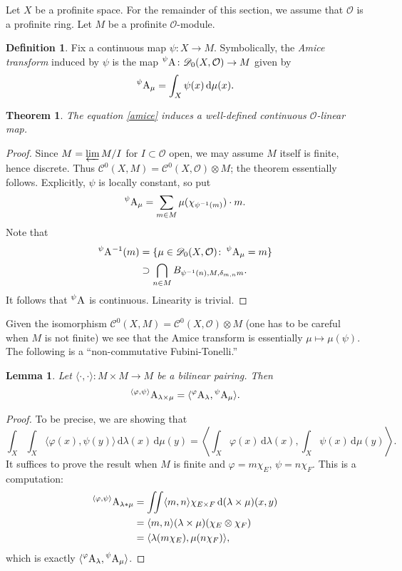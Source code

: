 \documentclass{article}
\newcommand{\cO}{\mathcal{O}}
\newcommand{\dd}{\mathrm{d}}
\newcommand{\sC}{\mathscr{C}}
\newcommand{\sD}{\mathscr{D}}
\newcommand{\amice}[2][]{\prescript{#1}{}{\mathrm{A}_{#2}}}
\newtheorem{lemma}[subsection]{Lemma}
\newtheorem{theorem}[subsection]{Theorem}
\theoremstyle{definition}
\newtheorem{definition}[subsection]{Definition}
\begin{document}
Let $X$ be a profinite space. For the remainder of this section, we assume that 
$\cO$ is a profinite ring. Let $M$ be a profinite $\cO$-module. 

\begin{definition}
Fix a continuous map $\psi\colon X\to M$. Symbolically, the \emph{Amice 
transform} induced by $\psi$ is the map 
$\amice[\psi]{}\colon \sD_0(X,\cO)\to M$ given by 
\begin{equation}\label{amice}
  \amice[\psi]{\mu} =  \int_X \psi(x)\, \dd \mu(x) .
\end{equation}
\end{definition}

\begin{theorem}
The equation \eqref{amice} induces a well-defined continuous $\cO$-linear map.
\end{theorem}
\begin{proof}
Since $M=\varprojlim M/I$ for $I\subset \cO$ open, we may assume $M$ itself is 
finite, hence discrete. Thus $\sC^0(X,M) = \sC^0(X,\cO)\otimes M$; the theorem 
essentially follows. Explicitly, $\psi$ is locally constant, so put
\[
  \amice[\psi]{\mu} = \sum_{m\in M} \mu(\chi_{\psi^{-1}(m)}) \cdot m.
\]
Note that 
\begin{align*}
  \amice[\psi]{}^{-1}(m) 
    &= \{\mu\in \sD_0(X,\cO)\colon \amice[\psi]{\mu} = m\} \\
    &\supset \bigcap_{n\in M} B_{\psi^{-1}(n),M,\delta_{m,n} m} .
\end{align*}
It follows that $\amice[\psi]{}$ is continuous. Linearity is trivial. 
\end{proof}

Given the isomorphism $\sC^0(X,M) = \sC^0(X,\cO)\otimes M$ (one has to be 
careful when $M$ is not finite) we see that the Amice transform is essentially 
$\mu\mapsto \mu(\psi)$. The following is a ``non-commutative Fubini-Tonelli.'' 

\begin{lemma}
Let $\langle\cdot,\cdot\rangle\colon M\times M\to M$ be a bilinear pairing. 
Then 
\[
  \amice[\langle\varphi,\psi\rangle]{\lambda\times\mu} = \langle \amice[\varphi]{\lambda},\amice[\psi]{\mu}\rangle .
\]
\end{lemma}
\begin{proof}
To be precise, we are showing that 
\[
  \int_X\int_X \langle\varphi(x),\psi(y)\rangle\, \dd\lambda(x)\, \dd\mu(y) = \left\langle \int_X \varphi(x)\, \dd\lambda(x),\int_X \psi(x)\, \dd\mu(y)\right\rangle .
\]
It suffices to prove the result when $M$ is finite and $\varphi=m \chi_E$, 
$\psi=n \chi_F$. This is a computation:
\begin{align*}
  \amice[\langle\varphi,\psi\rangle]{\lambda\ast\mu} 
    &= \iint \langle m,n\rangle \chi_{E\times F} \, \dd(\lambda\times \mu)(x,y) \\
    &= \langle m,n\rangle (\lambda\times\mu)(\chi_E\otimes \chi_F) \\
    &= \langle \lambda(m\chi_E),\mu(n\chi_F)\rangle ,
\end{align*}
which is exactly $\langle \amice[\varphi]{\lambda},\amice[\psi]{\mu}\rangle$. 
\end{proof}
\end{document}
